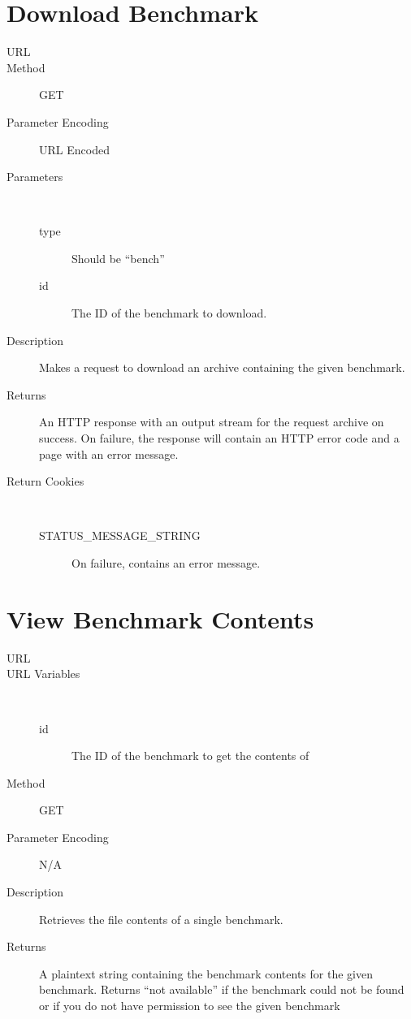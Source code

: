 \section{Download Benchmark}
\begin{description}
\item [URL] 
\item [Method] GET
\item [Parameter Encoding] URL Encoded
\item [Parameters] \
	\begin{description}
	\item [type]  Should be “bench”
	\item [id]  The ID of the benchmark to download.
	\end{description}
\item [Description] Makes a request to download an archive containing the given benchmark.
\item [Returns] An HTTP response with an output stream for the request archive on success. On failure, the response will contain an HTTP error code and a page with an error message.
\item [Return Cookies] \
	\begin{description}
	\item [STATUS\_MESSAGE\_STRING]  On failure, contains an error message.
	\end{description}
\end{description}


\section{View Benchmark Contents}
\begin{description}
\item [URL] 
\item [URL Variables] \
	\begin{description}
	\item [id] \type{Integer} The ID of the benchmark to get the contents of
	\end{description}
\item [Method] GET
\item [Parameter Encoding] N/A
\item [Description] Retrieves the file contents of a single benchmark.
\item [Returns] A plaintext string containing the benchmark contents for the given benchmark. Returns “not available” if the benchmark could not be found or if you do not have permission to see the given benchmark
\end{description}


